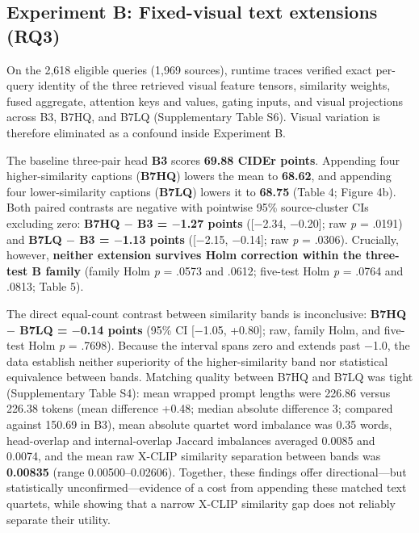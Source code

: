 \documentclass[11pt,a4paper]{article}
\begin{document}
\subsection{Experiment B: Fixed-visual text extensions (RQ3)}
On the 2,618 eligible queries (1,969 sources), runtime traces verified exact per-query identity of the three retrieved visual feature tensors, similarity weights, fused aggregate, attention keys and values, gating inputs, and visual projections across B3, B7HQ, and B7LQ (Supplementary Table S6). Visual variation is therefore eliminated as a confound inside Experiment B.

The baseline three-pair head \textbf{B3} scores \textbf{69.88 CIDEr points}. Appending four higher-similarity captions (\textbf{B7HQ}) lowers the mean to \textbf{68.62}, and appending four lower-similarity captions (\textbf{B7LQ}) lowers it to \textbf{68.75} (Table 4; Figure 4b). Both paired contrasts are negative with pointwise 95\% source-cluster CIs excluding zero: \textbf{B7HQ $-$ B3 = $-$1.27 points} ([$-$2.34, $-$0.20]; raw \emph{p} = .0191) and \textbf{B7LQ $-$ B3 = $-$1.13 points} ([$-$2.15, $-$0.14]; raw \emph{p} = .0306). Crucially, however, \textbf{neither extension survives Holm correction within the three-test B family} (family Holm \emph{p} = .0573 and .0612; five-test Holm \emph{p} = .0764 and .0813; Table 5).

The direct equal-count contrast between similarity bands is inconclusive: \textbf{B7HQ $-$ B7LQ = $-$0.14 points} (95\% CI [$-$1.05, +0.80]; raw, family Holm, and five-test Holm \emph{p} = .7698). Because the interval spans zero and extends past $-$1.0, the data establish neither superiority of the higher-similarity band nor statistical equivalence between bands. Matching quality between B7HQ and B7LQ was tight (Supplementary Table S4): mean wrapped prompt lengths were 226.86 versus 226.38 tokens (mean difference +0.48; median absolute difference 3; compared against 150.69 in B3), mean absolute quartet word imbalance was 0.35 words, head-overlap and internal-overlap Jaccard imbalances averaged 0.0085 and 0.0074, and the mean raw X-CLIP similarity separation between bands was \textbf{0.00835} (range 0.00500--0.02606). Together, these findings offer directional---but statistically unconfirmed---evidence of a cost from appending these matched text quartets, while showing that a narrow X-CLIP similarity gap does not reliably separate their utility.
\end{document}
